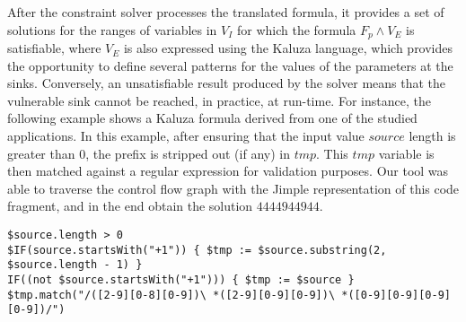 After the constraint solver processes the translated formula, it provides a set of solutions for the ranges of variables in $V_I$ for which the formula $F_p \wedge V_E$ is satisfiable, {\color{blue} where $V_E$ is also expressed using the Kaluza language, which provides the opportunity to define several patterns for the values of the parameters at the sinks.} Conversely, an unsatisfiable result produced by the solver means that the vulnerable sink cannot be reached, in practice, at run-time. For instance, the following example shows a Kaluza formula derived from one of the studied applications. In this example, after ensuring that the input value $source$ length is greater than 0, the prefix is stripped out (if any) in $tmp$. This $tmp$ variable is then matched against a regular expression for validation purposes. Our tool was able to traverse the control flow graph with the Jimple representation of this code fragment, and in the end obtain the solution $444494 4944$.
\lstset{numbers=left,xleftmargin=1cm, basicstyle=\ttfamily\scriptsize, breaklines=true}
\begin{lstlisting}
$source.length > 0
$IF(source.startsWith("+1")) { $tmp := $source.substring(2, $source.length - 1) }
IF((not $source.startsWith("+1"))) { $tmp := $source }
$tmp.match("/([2-9][0-8][0-9])\ *([2-9][0-9][0-9])\ *([0-9][0-9][0-9][0-9])/")
\end{lstlisting}

